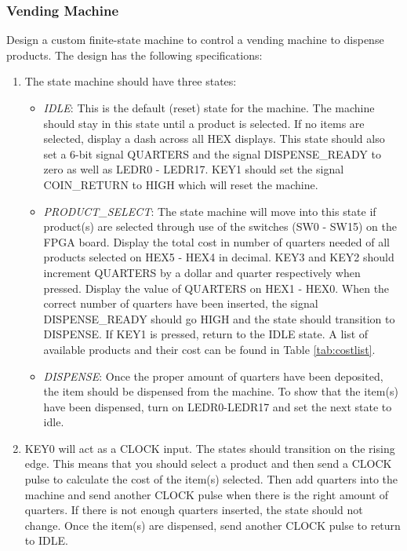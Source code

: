 \subsubsection{Vending Machine}

Design a custom finite-state machine to control a vending machine to dispense products. The design has the following specifications:

\begin{enumerate} 

	\item The state machine should have three states:

	\begin{itemize}
		\item \emph{IDLE}: This is the default (reset) state for the machine. The machine should stay in this state until a product is selected. If no items are selected, display a dash across all HEX displays. This state should also set a 6-bit signal QUARTERS and the signal DISPENSE\_READY to zero as well as LEDR0 - LEDR17. KEY1 should set the signal COIN\_RETURN to HIGH which will reset the machine.

		\item \emph{PRODUCT\_SELECT}: The state machine will move into this state if product(s) are selected through use of the switches (SW0 - SW15) on the FPGA board. Display the total cost in number of quarters needed of all products selected on HEX5 - HEX4 in decimal.  KEY3 and KEY2 should increment QUARTERS by a dollar and quarter respectively when pressed. Display the value of QUARTERS on HEX1 - HEX0. When the correct number of quarters have been inserted, the signal DISPENSE\_READY should go HIGH and the state should transition to DISPENSE. If KEY1 is pressed, return to the IDLE state. A list of available products and their cost can be found in Table \ref{tab:costlist}.

		\item \emph{DISPENSE}: Once the proper amount of quarters have been deposited, the item should be dispensed from the machine. To show that the item(s) have been dispensed, turn on LEDR0-LEDR17 and set the next state to idle.

	\end{itemize}
	
	\item KEY0 will act as a CLOCK input. The states should transition on the rising edge. This means that you should select a product and then send a CLOCK pulse to calculate the cost of the item(s) selected. Then add quarters into the machine and send another CLOCK pulse when there is the right amount of quarters. If there is not enough quarters inserted, the state should not change. Once the item(s) are dispensed, send another CLOCK pulse to return to IDLE.


\end{enumerate}
